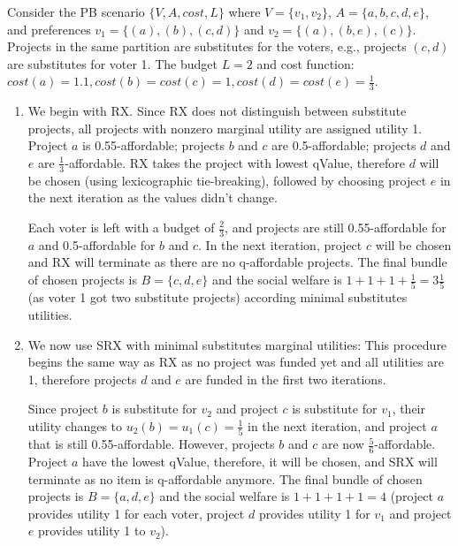 \documentclass[runningheads]{llncs}
\begin{document}
\begin{example}


Consider the 
PB scenario $\{V,A,cost,L\}$  where $V=\{v_1,v_2\}$, $A=\{a,b,c,d,e\}$, and preferences $v_1=\{(a),(b),(c,d)\}$ and  $v_2=\{(a),(b,e),(c)\}$. Projects in the same partition are  substitutes for the voters, e.g., projects $(c,d)$ are substitutes for voter 1. The budget $L=2$ and cost function: $cost(a)=1.1,cost(b)=cost(c)=1, cost(d)=cost(e)=\frac{1}{3}$. 


\begin{enumerate}
    \item  We begin with RX. Since  RX does not distinguish between substitute projects,   all projects with nonzero marginal utility  are assigned  utility 1.
    Project $a$ is 0.55-affordable; projects $b$ and $c$ are 0.5-affordable; projects $d$ and $e$ are $\frac{1}{3}$-affordable. RX takes the project with lowest qValue, therefore $d$ will be chosen (using lexicographic tie-breaking), followed by choosing project $e$ in the next iteration as the values didn't change.  
    
    Each voter is  left with a budget of $\frac{2}{3}$, and  projects are still 0.55-affordable for $a$ and 0.5-affordable for $b$ and $c$. In the next iteration, project $c$ will be chosen and RX will terminate as there are no  q-affordable projects. The final bundle of chosen projects is  $B=\{c,d,e\}$ and the social welfare is $1+1+1+\frac{1}{5}=3\frac{1}{5}$ (as voter 1 got two substitute projects) according minimal substitutes utilities. 
    
    \item We now use SRX  with minimal substitutes marginal utilities: This procedure begins  the same way as RX as no project was funded yet and all utilities are 1, therefore   projects $d$ and $e$ are funded in the first two iterations. 
    
    Since  project $b$ is substitute for $v_2$ and project $c$ is substitute for $v_1$, their utility changes  to $u_2(b)=u_1(c)=\frac{1}{5}$ in the next iteration, and project $a$ that is  still 0.55-affordable. However, projects $b$ and $c$ are now $\frac{5}{6}$-affordable. Project $a$ have the lowest qValue, therefore, it will be chosen, and SRX will terminate as no item is q-affordable anymore.
    The final bundle of chosen projects is $B=\{a,d,e\}$ and the social welfare is $1+1+1+1=4$ (project $a$ provides utility 1 for each voter, project $d$ provides utility 1 for $v_1$ and project $e$ provides utility 1 to $v_2$).
    

\end{enumerate}
\end{example}
\end{document}
